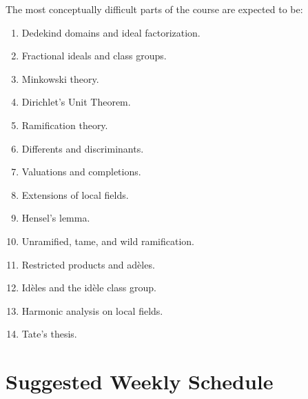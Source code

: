 \documentclass[11pt]{article}
\begin{document}
The most conceptually difficult parts of the course are expected to be:

\begin{enumerate}
    \item Dedekind domains and ideal factorization.
    \item Fractional ideals and class groups.
    \item Minkowski theory.
    \item Dirichlet's Unit Theorem.
    \item Ramification theory.
    \item Differents and discriminants.
    \item Valuations and completions.
    \item Extensions of local fields.
    \item Hensel's lemma.
    \item Unramified, tame, and wild ramification.
    \item Restricted products and adèles.
    \item Idèles and the idèle class group.
    \item Harmonic analysis on local fields.
    \item Tate's thesis.
\end{enumerate}

\section{Suggested Weekly Schedule}
\end{document}
